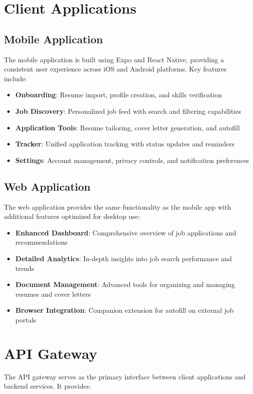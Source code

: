 \documentclass[12pt,a4paper]{report}
\begin{document}
\section{Client Applications}
\subsection{Mobile Application}
The mobile application is built using Expo and React Native, providing a consistent user experience across iOS and Android platforms. Key features include:

\begin{itemize}[leftmargin=2em]
  \item \textbf{Onboarding}: Resume import, profile creation, and skills verification
  \item \textbf{Job Discovery}: Personalized job feed with search and filtering capabilities
  \item \textbf{Application Tools}: Resume tailoring, cover letter generation, and autofill
  \item \textbf{Tracker}: Unified application tracking with status updates and reminders
  \item \textbf{Settings}: Account management, privacy controls, and notification preferences
\end{itemize}

\subsection{Web Application}
The web application provides the same functionality as the mobile app with additional features optimized for desktop use:

\begin{itemize}[leftmargin=2em]
  \item \textbf{Enhanced Dashboard}: Comprehensive overview of job applications and recommendations
  \item \textbf{Detailed Analytics}: In-depth insights into job search performance and trends
  \item \textbf{Document Management}: Advanced tools for organizing and managing resumes and cover letters
  \item \textbf{Browser Integration}: Companion extension for autofill on external job portals
\end{itemize}

\section{API Gateway}
The API gateway serves as the primary interface between client applications and backend services. It provides:
\end{document}
